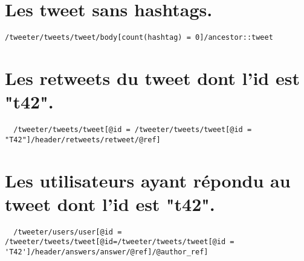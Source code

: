 \section{Les tweet sans hashtags.}
\begin{verbatim}
/tweeter/tweets/tweet/body[count(hashtag) = 0]/ancestor::tweet
\end{verbatim}

\section{Les retweets du tweet dont l’id est "t42".}
\begin{verbatim}
  /tweeter/tweets/tweet[@id = /tweeter/tweets/tweet[@id = "T42"]/header/retweets/retweet/@ref]
\end{verbatim}

\section{Les utilisateurs ayant répondu au tweet dont l’id est "t42".}
\begin{verbatim}
  /tweeter/users/user[@id = /tweeter/tweets/tweet[@id=/tweeter/tweets/tweet[@id = 'T42']/header/answers/answer/@ref]/@author_ref]
\end{verbatim}

